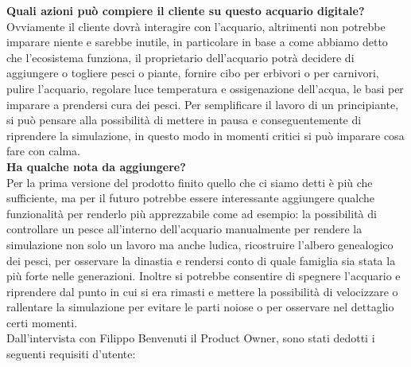 \documentclass[12pt,a4paper,oneside,article]{article}
\begin{document}
	{\large \textbf{Quali azioni può compiere il cliente su questo acquario digitale?}}\\
	Ovviamente il cliente dovrà interagire con l'acquario, altrimenti non potrebbe imparare niente e sarebbe inutile, in particolare in base a come abbiamo detto che l'ecosistema funziona, il proprietario dell'acquario potrà decidere di aggiungere o togliere pesci o piante, fornire cibo per erbivori o per carnivori, pulire l'acquario, regolare luce temperatura e ossigenazione dell'acqua, le basi per imparare a prendersi cura dei pesci. Per semplificare il lavoro di un principiante, si può pensare alla possibilità di mettere in pausa e conseguentemente di riprendere la simulazione, in questo modo in momenti critici si può imparare cosa fare con calma.
	\\
	
	{\large \textbf{Ha qualche nota da aggiungere?}}\\
	Per la prima versione del prodotto finito quello che ci siamo detti è più che sufficiente, ma per il futuro potrebbe essere interessante aggiungere qualche funzionalità per renderlo più apprezzabile come ad esempio: la possibilità di controllare un pesce all'interno dell'acquario manualmente per rendere la simulazione non solo un lavoro ma anche ludica, ricostruire l'albero genealogico dei pesci, per osservare la dinastia e rendersi conto di quale famiglia sia stata la più forte nelle generazioni. Inoltre si potrebbe consentire di spegnere l'acquario e riprendere dal punto in cui si era rimasti e mettere la possibilità di velocizzare o rallentare la simulazione per evitare le parti noiose o per osservare nel dettaglio certi momenti.
	\\
	
	Dall'intervista con Filippo Benvenuti il Product Owner, sono stati dedotti i seguenti requisiti d'utente:
	
\end{document}
